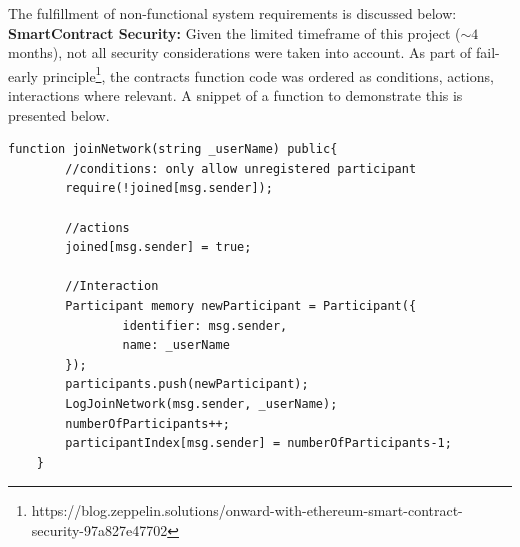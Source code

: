 The fulfillment of non-functional system requirements is discussed below:\\
\textbf{SmartContract Security:} Given the limited timeframe of this project
($\sim{4}$ months), not all security considerations were taken into account. As
part of fail-early
principle\footnote{https://blog.zeppelin.solutions/onward-with-ethereum-smart-contract-security-97a827e47702},
the contracts function code was ordered as conditions, actions, interactions
where relevant. A snippet of a function to demonstrate this is presented below. 

\begin{lstlisting}[language=Solidity]
	function joinNetwork(string _userName) public{
		//conditions: only allow unregistered participant
		require(!joined[msg.sender]);

		//actions
		joined[msg.sender] = true;
		
        //Interaction
		Participant memory newParticipant = Participant({
				identifier: msg.sender,
				name: _userName
        });
		participants.push(newParticipant);
        LogJoinNetwork(msg.sender, _userName);
        numberOfParticipants++;
        participantIndex[msg.sender] = numberOfParticipants-1;
    }
\end{lstlisting}

